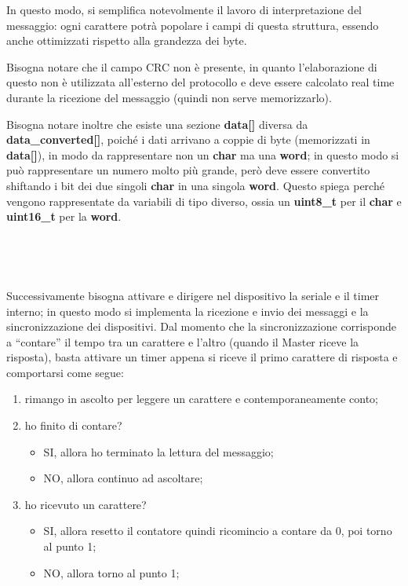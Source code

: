 \documentclass[a4paper,titlepage]{book}
\newcommand{\itema}{\begin{itemize}[noitemsep,topsep=10pt,parsep=23pt,partopsep=0pt]}
\begin{document}
In questo modo, si semplifica notevolmente il lavoro di interpretazione del messaggio: ogni carattere potrà popolare i campi di questa struttura, essendo anche ottimizzati rispetto alla grandezza dei byte. 

Bisogna notare che il campo CRC non è presente, in quanto l'elaborazione di questo non è utilizzata all'esterno del protocollo e deve essere calcolato real time durante la ricezione del messaggio (quindi non serve memorizzarlo).

Bisogna notare inoltre che esiste una sezione \textbf{data[]} diversa da \textbf{data\_converted[]}, poiché i dati arrivano a coppie di byte (memorizzati in \textbf{data[]}), in modo da rappresentare non un \textbf{char} ma una \textbf{word}; in questo modo si può rappresentare un numero molto più grande, però deve essere convertito shiftando i bit dei due singoli \textbf{char} in una singola \textbf{word}. Questo spiega perché vengono rappresentate da variabili di tipo diverso, ossia un \textbf{uint8\_t} per il \textbf{char} e \textbf{uint16\_t} per la \textbf{word}.

~

~

Successivamente bisogna attivare e dirigere nel dispositivo la seriale e il timer interno; in questo modo si implementa la ricezione e invio dei messaggi e la sincronizzazione dei dispositivi. Dal momento che la sincronizzazione corrisponde a ``contare'' il tempo tra un carattere e l'altro (quando il Master riceve la risposta), basta attivare un timer appena si riceve il primo carattere di risposta e comportarsi come segue:

\begin{enumerate}[noitemsep,topsep=15pt,parsep=6pt,partopsep=0pt]

\item rimango in ascolto per leggere un carattere e contemporaneamente conto;
\item ho finito di contare?
	\itema
	\item SI, allora ho terminato la lettura del messaggio;
	\item NO, allora continuo ad ascoltare;
	\end{itemize}
\item ho ricevuto un carattere?
	\itema
	\item SI, allora resetto il contatore quindi ricomincio a contare da 0, poi torno al punto 1;
	\item NO, allora torno al punto 1;
	\end{itemize}

\end{enumerate}
\end{document}
